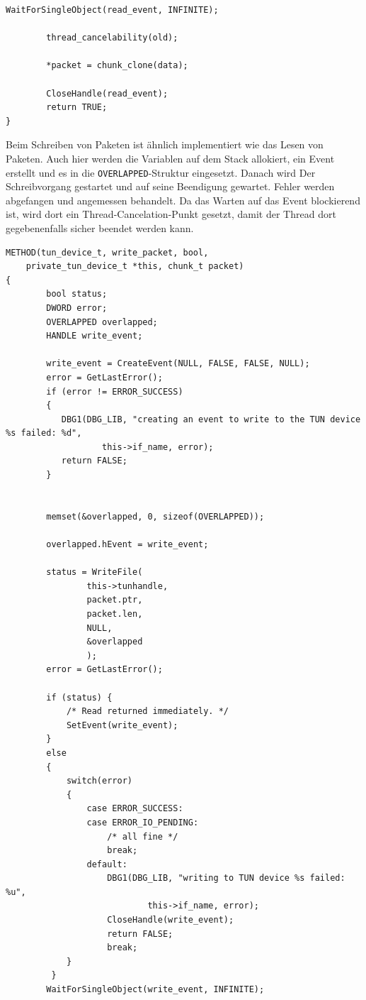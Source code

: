 {\begin{lstlisting}[caption=Code für read\_packet,label=lst:read_packet]
        WaitForSingleObject(read_event, INFINITE);

	    thread_cancelability(old);

	    *packet = chunk_clone(data);

        CloseHandle(read_event);
        return TRUE;
}
\end{lstlisting}

Beim Schreiben von Paketen ist ähnlich implementiert wie das Lesen von Paketen.
Auch hier werden die Variablen auf dem Stack allokiert, ein Event erstellt
und es in die \texttt{OVERLAPPED}-Struktur eingesetzt.
Danach wird Der Schreibvorgang gestartet und auf seine Beendigung gewartet.
Fehler werden abgefangen und angemessen behandelt. Da das Warten auf das Event
blockierend ist, wird dort ein Thread-Cancelation-Punkt gesetzt, damit der Thread dort
gegebenenfalls sicher beendet werden kann.

\begin{lstlisting}[caption=Code für write\_packet,label=lst:write_packet]
METHOD(tun_device_t, write_packet, bool,
	private_tun_device_t *this, chunk_t packet)
{
        bool status;
        DWORD error;
        OVERLAPPED overlapped;
        HANDLE write_event;

        write_event = CreateEvent(NULL, FALSE, FALSE, NULL);
        error = GetLastError();
        if (error != ERROR_SUCCESS)
        {
           DBG1(DBG_LIB, "creating an event to write to the TUN device %s failed: %d",
                   this->if_name, error);
           return FALSE;
        }


        memset(&overlapped, 0, sizeof(OVERLAPPED));

        overlapped.hEvent = write_event;

        status = WriteFile(
                this->tunhandle,
                packet.ptr,
                packet.len,
                NULL,
                &overlapped
                );
        error = GetLastError();

        if (status) {
            /* Read returned immediately. */
            SetEvent(write_event);
        }
        else
        {
            switch(error)
            {
                case ERROR_SUCCESS:
                case ERROR_IO_PENDING:
                    /* all fine */
                    break;
                default:
                    DBG1(DBG_LIB, "writing to TUN device %s failed: %u",
                            this->if_name, error);
                    CloseHandle(write_event);
                    return FALSE;
                    break;
            }
         }
        WaitForSingleObject(write_event, INFINITE);


\end{lstlisting}}

